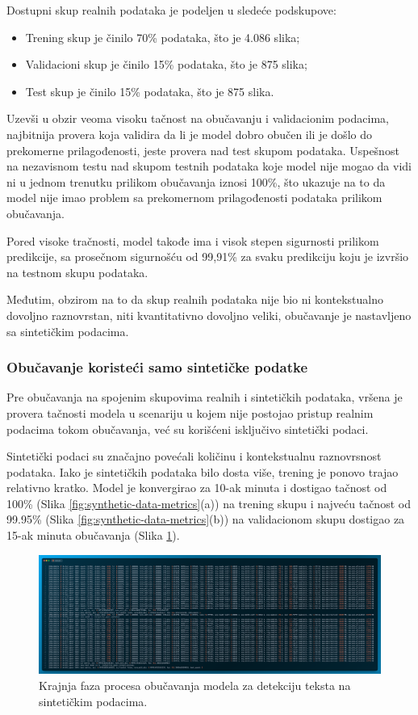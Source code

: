 \documentclass[a4paper,12pt]{article}
\begin{document}
	Dostupni skup realnih podataka je podeljen u sledeće podskupove:
	\begin{itemize}
		\item Trening skup je činilo 70\% podataka, što je 4.086 slika;
		\item Validacioni skup je činilo 15\% podataka, što je 875 slika;
		\item Test skup je činilo 15\% podataka, što je 875 slika.
	\end{itemize}
	
	Uzevši u obzir veoma visoku tačnost na obučavanju i validacionim podacima, najbitnija provera koja validira da li je model dobro obučen ili je došlo do prekomerne prilagođenosti, jeste provera nad test skupom podataka. Uspešnost na nezavisnom testu nad skupom testnih podataka koje model nije mogao da vidi ni u jednom trenutku prilikom obučavanja iznosi 100\%, što ukazuje na to da model nije imao problem sa prekomernom prilagođenosti podataka prilikom obučavanja.
	
	Pored visoke tračnosti, model takođe ima i visok stepen sigurnosti prilikom predikcije, sa prosečnom sigurnošću od 99,91\% za svaku predikciju koju je izvršio na testnom skupu podataka.
	
	Međutim, obzirom na to da skup realnih podataka nije bio ni kontekstualno dovoljno raznovrstan, niti kvantitativno dovoljno veliki, obučavanje je nastavljeno sa sintetičkim podacima.
	
	\subsubsection{Obučavanje koristeći samo sintetičke podatke}
	Pre obučavanja na spojenim skupovima realnih i sintetičkih podataka, vršena je provera tačnosti modela u scenariju u kojem nije postojao pristup realnim podacima tokom obučavanja, već su korišćeni isključivo sintetički podaci.
	
	Sintetički podaci su značajno povećali količinu i kontekstualnu raznovrsnost podataka. Iako je sintetičkih podataka bilo dosta više, trening je ponovo trajao relativno kratko. Model je konvergirao za 10-ak minuta i dostigao tačnost od 100\% (Slika \ref{fig:synthetic-data-metrics}(a)) na trening skupu i najveću tačnost od 99.95\% (Slika \ref{fig:synthetic-data-metrics}(b)) na validacionom skupu dostigao za 15-ak minuta obučavanja (Slika \ref{fig:train-code-synthetic-data}).
	
	\begin{figure}[H]
		\centering
		\includegraphics[width=\textwidth]{assets/train-code-synthetic-data.png}
		\caption{Krajnja faza procesa obučavanja modela za detekciju teksta na sintetičkim podacima.}
		\label{fig:train-code-synthetic-data}
	\end{figure}
	
\end{document}
